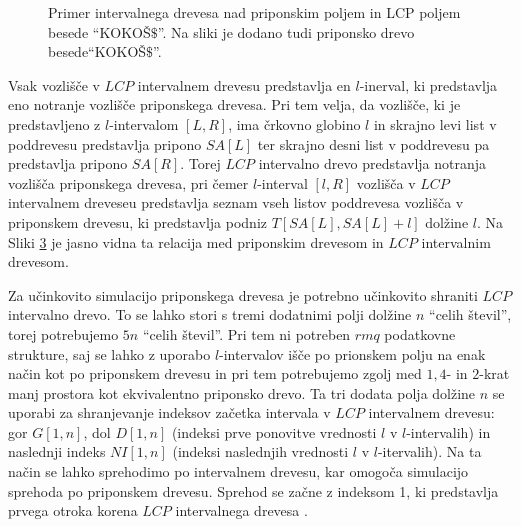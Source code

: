 \begin{figure}[htb]
    \begin{subfigure}[T]{0.45\linewidth}        
        
        \centering
        \subcaption*{}
        \label{fig:aSADrevo}
    \end{subfigure}
    \hspace{0.5cm}
    \begin{subfigure}[T]{0.45\linewidth}        
        
        \centering
        \subcaption*{}
        \label{fig:aSAPolje}
    \end{subfigure}

    \caption{Primer intervalnega drevesa nad priponskim poljem in LCP poljem besede \enquote{KOKOŠ$\$$}. Na sliki je dodano tudi priponsko drevo besede\enquote{KOKOŠ$\$$}.} 
    \label{fig:intervalTree}
\end{figure}

Vsak vozlišče v $LCP$ intervalnem drevesu predstavlja en $l$-inerval, ki predstavlja eno notranje vozlišče priponskega drevesa. Pri tem velja, da vozlišče, ki je predstavljeno z $l$-intervalom $[L,R]$, ima črkovno globino $l$ in skrajno levi list v poddrevesu predstavlja pripono $SA[L]$ ter skrajno desni list v poddrevesu pa predstavlja pripono $SA[R]$. Torej $LCP$ intervalno drevo predstavlja notranja vozlišča priponskega drevesa, pri čemer $l$-interval $[l,R]$ vozlišča v $LCP$ intervalnem dreveseu predstavlja seznam vseh listov poddrevesa vozlišča v priponskem drevesu, ki predstavlja podniz $T[SA[L],SA[L]+l]$ dolžine $l$. Na Sliki \ref{fig:intervalTree} je jasno vidna ta relacija med priponskim drevesom in $LCP$ intervalnim drevesom.

Za učinkovito simulacijo priponskega drevesa je potrebno učinkovito shraniti $LCP$ intervalno drevo. To se lahko stori s tremi dodatnimi polji dolžine $n$ \enquote{celih števil}, torej potrebujemo $5n$ \enquote{celih števil}. Pri tem ni potreben $rmq$ podatkovne strukture, saj se lahko z uporabo $l$-intervalov išče po prionskem polju na enak način kot po priponskem drevesu in pri tem potrebujemo zgolj med $1,4$- in $2$-krat manj prostora kot ekvivalentno priponsko drevo. Ta tri dodata polja dolžine $n$ se uporabi za shranjevanje indeksov začetka intervala v $LCP$ intervalnem drevesu: gor $G[1,n]$, dol $D[1,n]$ (indeksi prve ponovitve vrednosti $l$ v $l$-intervalih) in naslednji indeks $NI[1,n]$ (indeksi naslednjih vrednosti $l$ v $l$-itervalih). Na ta način se lahko sprehodimo po intervalnem drevesu, kar omogoča simulacijo sprehoda po priponskem drevesu. Sprehod se začne z indeksom 1, ki predstavlja prvega otroka korena $LCP$ intervalnega drevesa \cite{Abouelhoda2004}.

